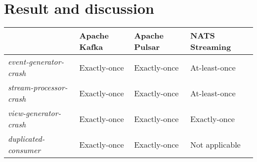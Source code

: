 \section{Result and discussion}
\begin{table}[h]
	\centering
	\begin{tabular}{|l|l|l|l|}
		\hline
		& Apache Kafka & Apache Pulsar & NATS Streaming \\ \hline
		\textit{event-generator-crash}  & Exactly-once & Exactly-once  & At-least-once  \\ \hline
		\textit{stream-processor-crash} & Exactly-once & Exactly-once  & At-least-once  \\ \hline
		\textit{view-generator-crash}   & Exactly-once & Exactly-once  & Exactly-once   \\ \hline
		\textit{duplicated-consumer}    & Exactly-once & Exactly-once  & Not applicable \\ \hline
	\end{tabular}
\end{table}